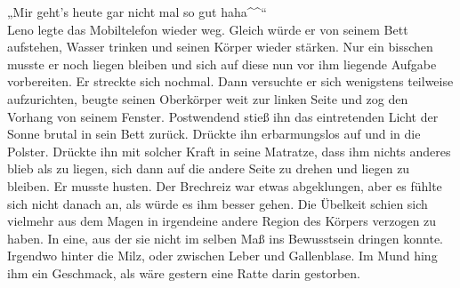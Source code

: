 \documentclass[ngerman,smalldemyvopaper,11pt,oneside,onecolumn,openright,extrafontsizes]{memoir}
\begin{document}
„Mir geht's heute gar nicht mal so gut haha\textasciicircum\textasciicircum“\\
Leno legte das Mobiltelefon wieder weg. Gleich würde er von seinem Bett aufstehen, Wasser trinken und seinen Körper wieder stärken. Nur ein bisschen musste er noch liegen bleiben und sich auf diese nun vor ihm liegende Aufgabe vorbereiten. Er streckte sich nochmal. Dann versuchte er sich wenigstens teilweise aufzurichten, beugte seinen Oberkörper weit zur linken Seite und zog den Vorhang von seinem Fenster. Postwendend stieß ihn das eintretenden Licht der Sonne brutal in sein Bett zurück. Drückte ihn erbarmungslos auf und in die Polster. Drückte ihn mit solcher Kraft in seine Matratze, dass ihm nichts anderes blieb als zu liegen, sich dann auf die andere Seite zu drehen und liegen zu bleiben. Er musste husten. Der Brechreiz war etwas abgeklungen, aber es fühlte sich nicht danach an, als würde es ihm besser gehen. Die Übelkeit schien sich vielmehr aus dem Magen in irgendeine andere Region des Körpers verzogen zu haben. In eine, aus der sie nicht im selben Maß ins Bewusstsein dringen konnte. Irgendwo hinter die Milz, oder zwischen Leber und Gallenblase. Im Mund hing ihm ein Geschmack, als wäre gestern eine Ratte darin gestorben.\\
\end{document}
